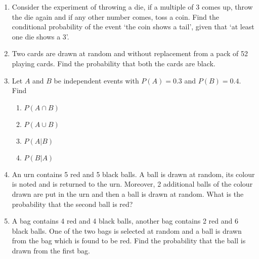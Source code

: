 \begin{enumerate}[label=\thesubsection.\arabic*,ref=\thesubsection.\theenumi]
    \begin{multicols}{4}
    \begin{enumerate}
        \item $A \subset B$ but $A \neq B$
        \item $A = B$ 
        \item $A \cap B = \phi$ 
        \item $\pr{A} = \pr{B}$
    \end{enumerate}
\end{multicols}
    \solution

 \item Consider the experiment of throwing a die, if a multiple of 3 comes up, 
    throw the die again and if any other number comes, toss a coin. Find the 
    conditional probability of the event `the coin shows a tail', given that `at 
    least one die shows a 3'.
%
%
\item Two cards are drawn at random and without replacement from a pack of 52 playing cards. Find the probability that both the cards are black.\\
\solution

%
\item Let $A$ and $B$ be independent events with $P(A)=0.3$ and $P(B)=0.4$. Find
		\label{ncert/12/13/2/7}
    \begin{multicols}{4}
\begin{enumerate}
\item $P(A \cap B)$
\item $P(A \cup B)$
\item $P(A|B)$
\item $P(B|A)$
\end{enumerate}
\end{multicols}
%
\item An urn contains 5 red and 5 black balls. A ball is drawn at random, its colour is
noted and is returned to the urn. Moreover, 2 additional balls of the colour drawn
are put in the urn and then a ball is drawn at random. What is the probability that
the second ball is red?
		\label{ncert/12/13/3/1}
\\
\solution

\item A bag contains 4 red and 4 black balls, another bag contains 2 red and 6 black
balls. One of the two bags is selected at random and a ball is drawn from the bag
which is found to be red. Find the probability that the ball is drawn from the
first bag.

\end{enumerate}
